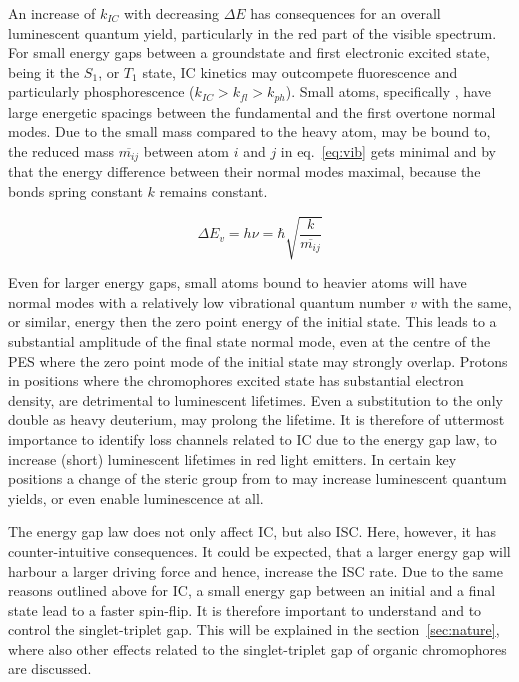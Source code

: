 				An increase of $k_{IC}$ with decreasing $\Delta E$ has consequences for an overall luminescent quantum yield, particularly in the red part of the visible spectrum. For small energy gaps between a groundstate and first electronic excited state, being it the $S_1$, or $T_1$ state, IC kinetics may outcompete fluorescence and particularly phosphorescence ($k_{IC} > k_{fl} > k_{ph}$). Small atoms, specifically ,  have large energetic spacings between the fundamental and the first overtone normal modes. Due to the small mass compared to the heavy atom,  may be bound to, the reduced mass $\overline{m_{ij}}$ between atom $i$ and $j$ in eq.~\ref{eq:vib} gets minimal and by that the energy difference between their normal modes maximal, because the bonds spring constant $k$ remains constant.

				\begin{equation}
					\label{eq:vib}
					\Delta E_v = h\nu = \hbar\sqrt{\frac{k}{\overline{m_{ij}}}}
				\end{equation}

				Even for larger energy gaps, small atoms bound to heavier atoms will have normal modes with a relatively low vibrational quantum number $v$ with the same, or similar, energy then the zero point energy of the initial state. This leads to a substantial amplitude of the final state normal mode, even at the centre of the PES where the zero point mode of the initial state may strongly overlap. Protons in positions where the chromophores excited state has substantial electron density, are detrimental to luminescent lifetimes. Even a substitution to the only double as heavy deuterium, may prolong the lifetime. %
				It is therefore of uttermost importance to identify loss channels related to IC due to the energy gap law, to increase (short) luminescent lifetimes in red light emitters. In certain key positions a change of the steric group from \ce{\Me} to \ce{\tBu} may increase luminescent quantum yields, or even enable luminescence at all. %
				
				The energy gap law does not only affect IC, but also ISC. Here, however, it has counter-intuitive consequences. It could be expected, that a larger energy gap will harbour a larger driving force and hence, increase the ISC rate. Due to the same reasons outlined above for IC, a small energy gap between an initial and a final state lead to a faster spin-flip. It is therefore important to understand and to control the singlet-triplet gap. This will be explained in the section~\ref{sec:nature}, where also other effects related to the singlet-triplet gap of organic chromophores are discussed.

